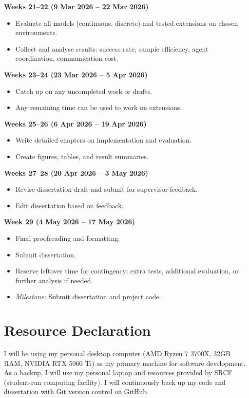 \begin{list}{}{\leftmargin=0cm \itemindent=0cm}
\item \textbf{Weeks 21--22 (9 Mar 2026 -- 22 Mar 2026)}
\begin{itemize}
\item Evaluate all models (continuous, discrete) and tested extensions on chosen environments.
\item Collect and analyse results: success rate, sample efficiency, agent coordination, communication cost.
\end{itemize}

\item \textbf{Weeks 23--24 (23 Mar 2026 -- 5 Apr 2026)}
\begin{itemize}
\item Catch up on any uncompleted work or drafts.
\item Any remaining time can be used to work on extensions.
\end{itemize}

\item \textbf{Weeks 25--26 (6 Apr 2026 -- 19 Apr 2026)}
\begin{itemize}
\item Write detailed chapters on implementation and evaluation.
\item Create figures, tables, and result summaries.
\end{itemize}

\item \textbf{Weeks 27--28 (20 Apr 2026 -- 3 May 2026)}
\begin{itemize}
\item Revise dissertation draft and submit for supervisor feedback.
\item Edit dissertation based on feedback.
\end{itemize}

\item \textbf{Week 29 (4 May 2026 -- 17 May 2026)}
\begin{itemize}
\item Final proofreading and formatting.
\item Submit dissertation.
\item Reserve leftover time for contingency: extra tests, additional evaluation, or further analysis if needed.
\item \textit{Milestone:} Submit dissertation and project code.
\end{itemize}

\end{list}

\section{Resource Declaration}

I will be using my personal desktop computer (AMD Ryzen 7 3700X, 32GB RAM, NVIDIA RTX 5060 Ti) as my primary
machine for software development. As a backup, I will use my personal laptop and resources provided by SRCF (student-run computing facility). I will continuously back up my code and dissertation with Git version control on GitHub.

\pagebreak


